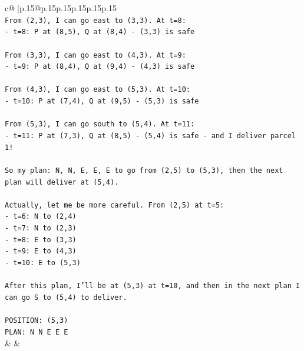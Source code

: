 \documentclass{article}
\begin{document}
{\begin{supertabular}{c@{$\;$}|p{.15\linewidth}@{}p{.15\linewidth}p{.15\linewidth}p{.15\linewidth}p{.15\linewidth}p{.15\linewidth}}
{{{\\ 
\texttt{From (2,3), I can go east to (3,3). At t=8:} \\
\texttt{{-} t=8: P at (8,5), Q at (8,4) {-} (3,3) is safe} \\
\\ 
\texttt{From (3,3), I can go east to (4,3). At t=9:} \\
\texttt{{-} t=9: P at (8,4), Q at (9,4) {-} (4,3) is safe} \\
\\ 
\texttt{From (4,3), I can go east to (5,3). At t=10:} \\
\texttt{{-} t=10: P at (7,4), Q at (9,5) {-} (5,3) is safe} \\
\\ 
\texttt{From (5,3), I can go south to (5,4). At t=11:} \\
\texttt{{-} t=11: P at (7,3), Q at (8,5) {-} (5,4) is safe {-} and I deliver parcel 1!} \\
\\ 
\texttt{So my plan: N, N, E, E, E to go from (2,5) to (5,3), then the next plan will deliver at (5,4).} \\
\\ 
\texttt{Actually, let me be more careful. From (2,5) at t=5:} \\
\texttt{{-} t=6: N to (2,4)} \\
\texttt{{-} t=7: N to (2,3)} \\
\texttt{{-} t=8: E to (3,3)} \\
\texttt{{-} t=9: E to (4,3)} \\
\texttt{{-} t=10: E to (5,3)} \\
\\ 
\texttt{After this plan, I'll be at (5,3) at t=10, and then in the next plan I can go S to (5,4) to deliver.} \\
\\ 
\texttt{POSITION: (5,3)} \\
\texttt{PLAN: N N E E E} \\
            }
        }
    }
    & & \\ \\


\end{supertabular}}
\end{document}
